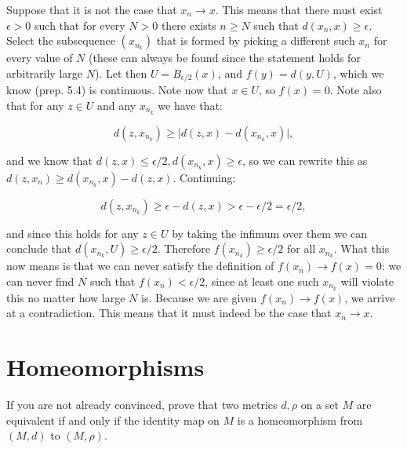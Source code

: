 \begin{solution}
    
    Suppose that it is not the case that $x_n \rightarrow x$.
    This means that there must exist $\epsilon > 0$ such that for every $N > 0$ there exists $n \geq N$ such that $d(x_n, x) \geq \epsilon$.
    Select the subsequence $(x_{n_k})$ that is formed by picking a different such $x_n$ for every value of $N$ (these can always be found since the statement holds for arbitrarily large $N$).
    Let then $U = B_{\epsilon/2}(x)$, and $f(y) = d(y, U)$, which we know (prep. 5.4) is continuous.
    Note now that $x \in U$, so $f(x) = 0$.
    Note also that for any $z \in U$ and any $x_{n_k}$ we have that:

    \[d(z, x_{n_k}) \geq \lvert d(z, x) - d(x_{n_k}, x) \rvert,\]

    and we know that $d(z, x) \leq \epsilon/2, d(x_{n_k}, x) \geq \epsilon$, so we can rewrite this as $d(z, x_n) \geq d(x_{n_k}, x) - d(z, x)$.
    Continuing:

    \[d(z, x_{n_k}) \geq \epsilon - d(z, x) > \epsilon - \epsilon/2 = \epsilon/2,\]

    and since this holds for any $z \in U$ by taking the infimum over them we can conclude that $d(x_{n_k}, U) \geq \epsilon/2$.
    Therefore $f(x_{n_k}) \geq \epsilon/2$ for all $x_{n_k}$.
    What this now means is that we can never satisfy the definition of $f(x_n) \rightarrow f(x) = 0$: we can never find $N$ such that $f(x_{n}) < \epsilon/2$, since at least one such $x_{n_k}$ will violate this no matter how large $N$ is.
    Because we are given $f(x_n) \rightarrow f(x)$, we arrive at a contradiction.
    This means that it must indeed be the case that $x_n \rightarrow x$.
\end{solution}

\section{Homeomorphisms}

\begin{exercise}{43}
    If you are not already convinced, prove that two metrics $d, \rho$ on a set $M$ are equivalent if and only if the identity map on $M$ is a homeomorphism from $(M, d)$ to $(M, \rho)$.
\end{exercise}

